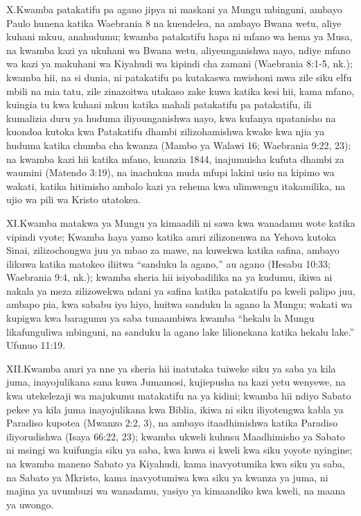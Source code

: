 \lettrine{X.} Kwamba patakatifu pa agano jipya ni maskani ya Mungu mbinguni, ambayo Paulo hunena katika Waebrania 8 na kuendelea, na ambayo Bwana wetu, aliye kuhani mkuu, anahudumu; kwamba patakatifu hapa ni mfano wa hema ya Musa, na kwamba kazi ya ukuhani wa Bwana wetu, aliyeunganishwa nayo, ndiye mfano wa kazi ya makuhani wa Kiyahudi wa kipindi cha zamani (Waebrania 8:1-5, nk.); kwamba hii, na si dunia, ni patakatifu pa kutakaswa mwishoni mwa zile siku elfu mbili na mia tatu, zile zinazoitwa utakaso zake kuwa katika kesi hii, kama mfano, kuingia tu kwa kuhani mkuu katika mahali patakatifu pa patakatifu, ili kumalizia duru ya huduma iliyounganishwa nayo, kwa kufanya upatanisho na kuondoa kutoka kwa Patakatifu dhambi zilizohamishwa kwake kwa njia ya huduma katika chumba cha kwanza (Mambo ya Walawi 16; Waebrania 9:22, 23); na kwamba kazi hii katika mfano, kuanzia 1844, inajumuisha kufuta dhambi za waumini (Matendo 3:19), na inachukua muda mfupi lakini usio na kipimo wa wakati, katika hitimisho ambalo kazi ya rehema kwa ulimwengu itakamilika, na ujio wa pili wa Kristo utatokea.

\lettrine{XI.} Kwamba matakwa ya Mungu ya kimaadili ni sawa kwa wanadamu wote katika vipindi vyote; Kwamba haya yamo katika amri zilizonenwa na Yehova kutoka Sinai, zilizochongwa juu ya mbao za mawe, na kuwekwa katika safina, ambayo ilikuwa katika matokeo iliitwa “sanduku la agano,” au agano (Hesabu 10:33; Waebrania 9:4, nk.); kwamba sheria hii isiyobadilika na ya kudumu, ikiwa ni nakala ya meza zilizowekwa ndani ya safina katika patakatifu pa kweli palipo juu, ambapo pia, kwa sababu iyo hiyo, huitwa sanduku la agano la Mungu; wakati wa kupigwa kwa baragumu ya saba tunaambiwa kwamba “hekalu la Mungu likafunguliwa mbinguni, na sanduku la agano lake lilionekana katika hekalu lake.” Ufunuo 11:19.

\lettrine{XII.} Kwamba amri ya nne ya sheria hii inatutaka tuiweke siku ya saba ya kila juma, inayojulikana sana kuwa Jumamosi, kujiepusha na kazi yetu wenyewe, na kwa utekelezaji wa majukumu matakatifu na ya kidini; kwamba hii ndiyo Sabato pekee ya kila juma inayojulikana kwa Biblia, ikiwa ni siku iliyotengwa kabla ya Paradiso kupotea (Mwanzo 2:2, 3), na ambayo itaadhimishwa katika Paradiso iliyorudishwa (Isaya 66:22, 23); kwamba ukweli kuhusu Maadhimisho ya Sabato ni msingi wa kuifungia siku ya saba, kwa kuwa si kweli kwa siku yoyote nyingine; na kwamba maneno Sabato ya Kiyahudi, kama inavyotumika kwa siku ya saba, na Sabato ya Mkristo, kama inavyotumiwa kwa siku ya kwanza ya juma, ni majina ya uvumbuzi wa wanadamu, yasiyo ya kimaandiko kwa kweli, na maana ya uwongo.

